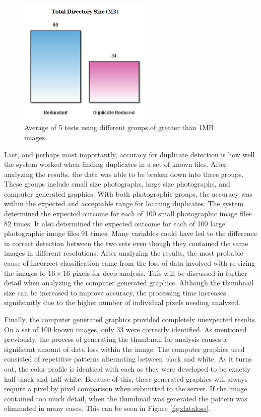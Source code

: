 \begin{figure}[htbp]
\centering
\includegraphics[width=2.5in]{largeaverage}
\caption{Average of 5 tests using different groups of greater than 1MB images.}
\label{fig:largeaverage}
\end{figure}

Last, and perhaps most importantly, accuracy for duplicate detection is how well the system worked when finding duplicates in a set of known files. After analyzing the results, the data was able to be broken down into three groups. These groups include small size photographs, large size photographs, and computer generated graphics. With both photographic groups, the accuracy was within the expected and acceptable range for locating duplicates. The system determined the expected outcome for each of 100 small photographic image files 82 times. It also determined the expected outcome for each of 100 large photographic image files 91 times. Many variables could have led to the difference in correct detection between the two sets even though they contained the same images in different resolutions. After analyzing the results, the most probable cause of incorrect classification came from the loss of data involved with re-sizing the images to $16 \times 16$ pixels for deep analysis. This will be discussed in further detail when analyzing the computer generated graphics. Although the thumbnail size can be increased to improve accuracy, the processing time increases significantly due to the higher number of individual pixels needing analyzed.

Finally, the computer generated graphics provided completely unexpected results. On a set of 100 known images, only 33 were correctly identified. As mentioned previously, the process of generating the thumbnail for analysis causes a significant amount of data loss within the image. The computer graphics used consisted of repetitive patterns alternating between black and white. As it turns out, the color profile is identical with each as they were developed to be exactly half black and half white. Because of this, these generated graphics will always require a pixel by pixel comparison when submitted to the server. If the image contained too much detail, when the thumbnail was generated the pattern was eliminated in many cases. This can be seen in Figure \ref{fig:dataloss}.

